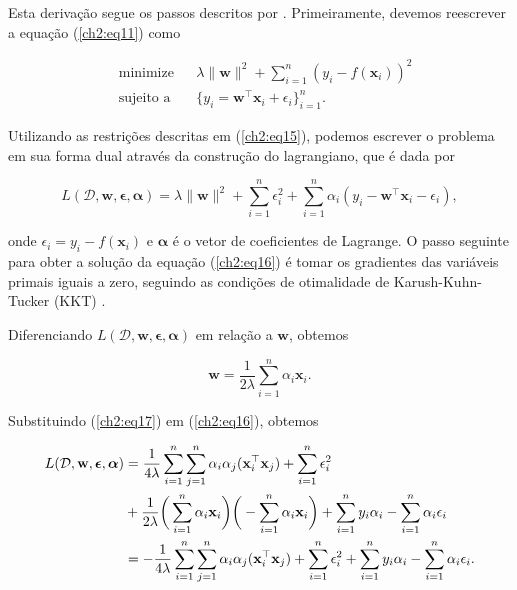 Esta derivação segue os passos descritos por . Primeiramente, devemos reescrever a equação (\ref{ch2:eq11}) como

\begin{equation}
    \label{ch2:eq15}
    \begin{aligned}
        & \text{minimize}
        & & \lambda \|\mathbf{w}\|^2 + \sum_{i=1}^{n}{(y_i - f(\mathbf{x}_i))^2} \\
        & \text{sujeito a}
        & & \{y_i = \mathbf{w}^{\top}\mathbf{x}_i + \epsilon_i\}_{i=1}^{n}.
    \end{aligned}
\end{equation}

Utilizando as restrições descritas em (\ref{ch2:eq15}), podemos escrever o problema em sua forma dual através da construção do lagrangiano, que é dada por

\begin{equation}
    \label{ch2:eq16}
    L(\mathcal{D}, \mathbf{w}, \boldsymbol{\epsilon}, \boldsymbol{\alpha}) = \lambda \|\mathbf{w}\|^2 + \sum_{i=1}^{n}{\epsilon_i^{2} + \sum_{i=1}^{n} \alpha_i(y_i - \mathbf{w}^{\top}\mathbf{x}_i - \epsilon_i)},
\end{equation}

\noindent onde $\epsilon_i = y_i - f(\mathbf{x}_i)$ e $\boldsymbol{\alpha}$ é o vetor de coeficientes de Lagrange. O passo seguinte para obter a solução da equação (\ref{ch2:eq16}) é tomar os gradientes das variáveis primais iguais a zero, seguindo as condições de otimalidade de Karush-Kuhn-Tucker (KKT) \cite{boyd2004}.

Diferenciando $L(\mathcal{D}, \mathbf{w}, \boldsymbol{\epsilon}, \boldsymbol{\alpha})$ em relação a $\mathbf{w}$, obtemos

\begin{equation}
    \label{ch2:eq17}
    \mathbf{w} = \frac{1}{2\lambda} \sum_{i=1}^{n} \alpha_i \mathbf{x}_i.
\end{equation}

\noindent Substituindo (\ref{ch2:eq17}) em (\ref{ch2:eq16}), obtemos

\begin{align}
    \label{ch2:eq18}
    L(\mathcal{D}, \mathbf{w}, \boldsymbol{\epsilon}, \boldsymbol{\alpha}) 
    &= \frac{1}{4\lambda} \sum_{i=1}^{n} \sum_{j=1}^{n} \alpha_i \alpha_j (\mathbf{x}_i^{\top} \mathbf{x}_j) + \sum_{i=1}^{n} \epsilon_i^2 \notag \\
    &+ \frac{1}{2\lambda} \bigg{(}\sum_{i=1}^{n} \alpha_i \mathbf{x}_i\bigg{)}\bigg{(}-\sum_{i=1}^{n} \alpha_i \mathbf{x}_i\bigg{)} + \sum_{i=1}^{n} y_i \alpha_i - \sum_{i=1}^{n} \alpha_i \epsilon_i \notag \\
    &= -\frac{1}{4\lambda} \sum_{i=1}^{n} \sum_{j=1}^{n} \alpha_i \alpha_j (\mathbf{x}_i^{\top} \mathbf{x}_j) + \sum_{i=1}^{n} \epsilon_i^2 + \sum_{i=1}^{n} y_i \alpha_i - \sum_{i=1}^{n} \alpha_i \epsilon_i.
\end{align}

